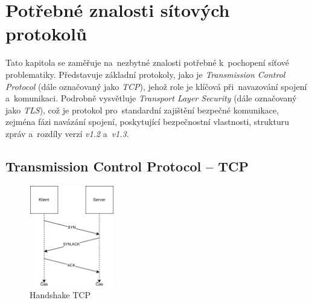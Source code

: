 \chapter{Potřebné znalosti sítových protokolů}
\label{chp: network}
Tato kapitola se zaměřuje na~nezbytné znalosti potřebné k~pochopení síťové problematiky. Představuje základní protokoly, jako je \textit{Transmission Control Protocol} (dále označovaný jako \textit{TCP}), jehož role je klíčová při~navazování spojení a~komunikaci. Podrobně vysvětluje \textit{Transport Layer Security} (dále označovaný jako \textit{TLS}), což je protokol pro~standardní zajištění bezpečné komunikace, zejména fázi navázání spojení, poskytující bezpečnostní vlastnosti, strukturu zpráv a~rozdíly verzí \textit{v1.2} a~\textit{v1.3}.

\section{Transmission Control Protocol – TCP}
\label{sec:tcp}
\begin{figure}
	\centering
	\includegraphics[width=0.33\textwidth]{obrazky-figures/3way-handshake-tcp.pdf}
	\caption{Handshake TCP}
	\label{fig:tcp-handshake}
\end{figure}
\FloatBarrier

